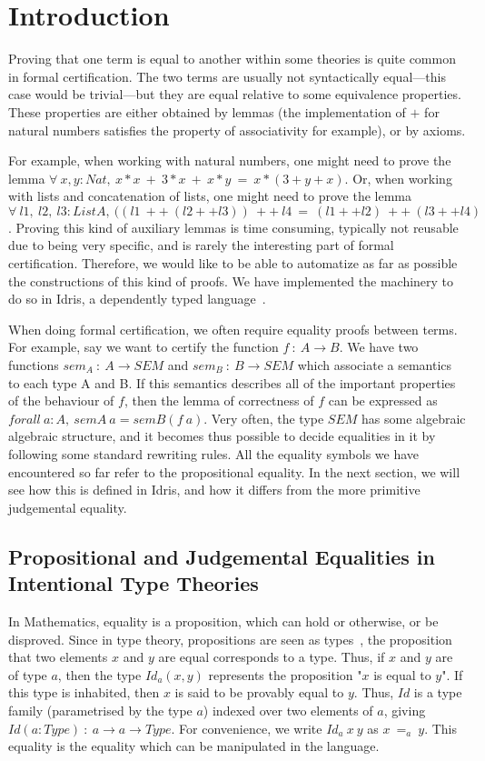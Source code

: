 \section{Introduction}

Proving that one term is equal to another within some theories is quite common
in formal certification. The two terms are usually not syntactically 
equal---this case would be trivial---but they are equal relative to some
equivalence properties. These properties are either obtained by lemmas
(the implementation of $+$ for natural numbers satisfies the property of
associativity for example), or by axioms.

For example, when working with natural numbers, one might need to prove the
lemma $\forall\ x, y:Nat,\ x*x\ +\ 3*x\ +\ x*y\ =\ x*(3+y+x)$. Or,
when working
with lists and concatenation of lists, one might need to prove the lemma
$\forall\ l1,\ l2,\ l3:List A,\ ((l1\ ++\ (l2 ++ l3))\ ++\ l4\ =\ (l1++l2)\ ++\
(l3++l4)$. Proving this kind of auxiliary lemmas is time consuming,
typically not reusable due to being very specific, and is rarely
the interesting part of formal
certification. Therefore, we would like to be able to automatize as far as
possible the constructions of this kind of proofs. We have implemented
the machinery to do so in Idris, a
dependently typed language~\cite{brady2013idris}.

When doing formal certification, we often require equality proofs between
terms.
For example, say we want to certify the function $f\ :\ A \rightarrow
B$. We have two functions $sem_A\ :\ A \rightarrow SEM$ and $sem_B\ : \ B
\rightarrow SEM$ which associate a semantics to each type A
and B. If this semantics describes all of the important properties of
the behaviour of $f$,
then the lemma of correctness of $f$ can be expressed as $forall\ a:A,\ semA\ a =
semB (f\ a)$. Very often, the type $SEM$ has some algebraic
algebraic structure, and it becomes thus possible to
decide equalities in it by following some standard rewriting rules.  
All the equality symbols we have
encountered so far refer to the propositional equality. In the next section,
we will see how this is defined in Idris, and how it differs from the more
primitive judgemental equality.

\subsection{Propositional and Judgemental Equalities in Intentional Type Theories}
In Mathematics, equality is a proposition, which can hold or otherwise, or be disproved.
Since in type theory, propositions are seen as types~\cite{How80}, the
proposition that two elements $x$ and $y$ are equal corresponds to a type.
Thus, if $x$ and $y$ are of type $a$, then the type
$Id_a(x, y)$ represents the proposition "$x$ is equal to $y$". If this type is
inhabited, then $x$ is said to be provably equal to $y$.  Thus, $Id$ is a type
family (parametrised by the type $a$) indexed over two elements of $a$, giving
$Id (a:Type)\ :\ a \rightarrow a \rightarrow Type$. For
convenience, we write $Id_a\ x\ y$ as $x\ =_a\ y$.  This equality is the
equality which can be manipulated in the language. 

